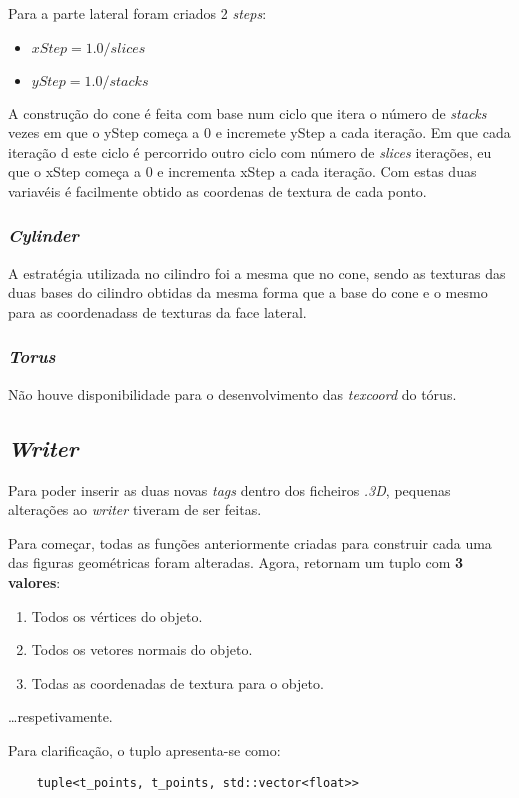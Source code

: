 \documentclass[relatorio.tex]{subfiles}
\begin{document}
Para a parte lateral foram criados 2 \textit{steps}:
\begin{itemize}
    \item $xStep = 1.0 / slices$
    \item $yStep = 1.0 / stacks$
\end{itemize}

A construção do cone é feita com base num ciclo que itera o número de \textit{stacks}
vezes em que o yStep começa a 0 e incremete yStep a cada iteração. Em que cada iteração d
este ciclo é percorrido outro ciclo com número de \textit{slices} iterações, eu que o xStep começa
a 0 e incrementa xStep a cada iteração. Com estas duas variavéis é facilmente obtido as coordenas de textura
de cada ponto.


\subsubsection{\textit{Cylinder}}
A estratégia utilizada no cilindro foi a mesma que no cone, sendo
as texturas das duas bases do cilindro obtidas da mesma forma que
a base do cone e o mesmo para as coordenadass de texturas da face lateral.

\subsubsection{\textit{Torus}}
Não houve disponibilidade para o desenvolvimento das \textit{texcoord} do tórus.


\subsection{\textit{Writer}} \label{subsec:writer}

Para poder inserir as duas novas \textit{tags}
dentro dos ficheiros \textit{.3D}, pequenas 
alterações ao \textit{writer} tiveram de ser feitas.

Para começar, todas as funções anteriormente 
criadas para construir cada uma das figuras 
geométricas foram alteradas.
Agora, retornam um tuplo com \textbf{3 valores}:
\begin{enumerate}
    \item Todos os vértices do objeto.
    \item Todos os vetores normais do objeto.
    \item Todas as coordenadas de textura para o objeto.
\end{enumerate}
\dots respetivamente.

Para clarificação, o tuplo apresenta-se como:
\begin{verbatim}
    tuple<t_points, t_points, std::vector<float>> 
\end{verbatim}
\end{document}
